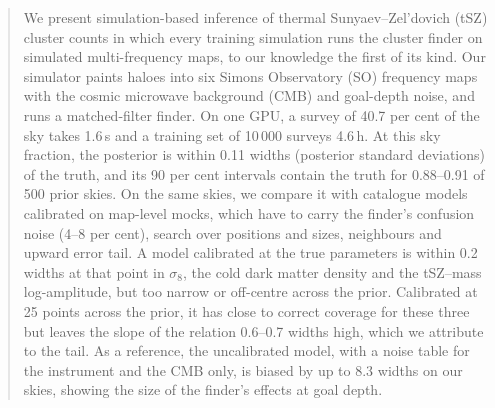 \begin{abstract}
We present simulation-based inference of thermal Sunyaev--Zel'dovich (tSZ) cluster counts in which every
training simulation runs the cluster finder on simulated multi-frequency maps, to our knowledge the first
of its kind. Our simulator paints haloes into six Simons Observatory (SO) frequency maps with the cosmic
microwave background (CMB) and goal-depth noise, and runs a matched-filter finder. On one GPU, a survey of
40.7 per cent of the sky takes 1.6\,s and a training set of 10\,000 surveys 4.6\,h. At this sky fraction, the
posterior is within 0.11 widths (posterior standard deviations) of the truth, and its 90 per cent
intervals contain the truth for 0.88--0.91 of 500 prior skies. On the same skies, we compare it with
catalogue models calibrated on map-level mocks, which have to carry the finder's confusion noise (4--8 per
cent), search over positions and sizes, neighbours and upward error tail. A model calibrated at the
true parameters is within 0.2 widths at that point in $\sigma_8$, the cold dark matter density and the
tSZ--mass log-amplitude, but too narrow or off-centre across the prior. Calibrated at 25 points across
the prior, it has close to correct coverage for these three but leaves the slope of the relation
0.6--0.7 widths high, which we attribute to the tail. As a reference, the uncalibrated model, with a noise
table for the instrument and the CMB only, is biased by up to 8.3 widths on our skies, showing the size of
the finder's effects at goal depth.
\end{abstract}
